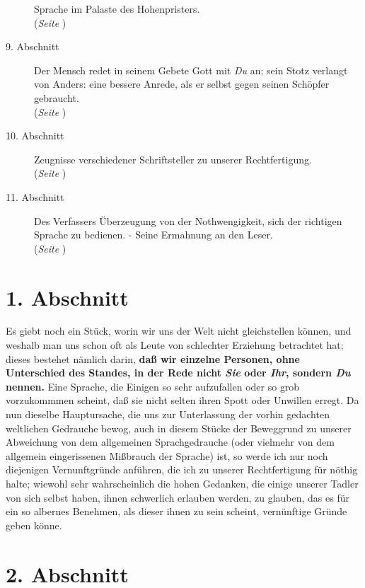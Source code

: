 \begin{description}
Sprache im Palaste des Hohenpristers.
\\(\textit{Seite \pageref{kap10_ab8}})
\item[9. Abschnitt] Der Mensch redet in seinem Gebete Gott mit \textit{Du} an; sein
Stotz verlangt von Anders: eine bessere Anrede, als er selbst gegen seinen
Schöpfer gebraucht.
\\(\textit{Seite \pageref{kap10_ab9}})
\item[10. Abschnitt] Zeugnisse verschiedener Schriftsteller zu unserer
Rechtfertigung.
\\(\textit{Seite \pageref{kap10_ab10}})
\item[11. Abschnitt] Des Verfassers Überzeugung von der Nothwengigkeit, sich
der richtigen Sprache zu bedienen. - Seine Ermahnung an den Leser.
\\(\textit{Seite \pageref{kap10_ab11}})

\end{description}
\normalsize

\section{1. Abschnitt} \label{kap10_ab1}

Es giebt noch ein Stück, worin wir uns der Welt nicht gleichstellen können, und
weshalb man uns schon oft als Leute von schlechter Erziehung betrachtet hat;
dieses bestehet nämlich darin, \textbf{daß wir einzelne Personen, ohne Unterschied des
Standes, in der Rede nicht \textit{Sie} oder \textit{Ihr}, sondern \textit{Du} nennen.} Eine
Sprache, die Einigen so sehr aufzufallen oder so grob vorzukommmen scheint, daß
sie nicht selten ihren Spott oder Unwillen erregt. Da nun dieselbe Hauptursache,
die uns zur Unterlassung der vorhin gedachten weltlichen Gedrauche bewog, auch
in diesem Stücke der Beweggrund zu unserer Abweichung von dem allgemeinen
Sprachgedrauche (oder vielmehr von dem allgemein eingerissenen Mißbrauch der
Sprache) ist, so werde ich nur noch diejenigen Vernunftgründe anführen, die ich
zu unserer Rechtfertigung für nöthig halte; wiewohl sehr wahrscheinlich die
hohen Gedanken, die einige unserer Tadler von sich selbst haben, ihnen
schwerlich erlauben werden, zu glauben, das es für ein so albernes Benehmen, als
dieser ihnen zu sein scheint, vernünftige Gründe geben könne.

\section{2. Abschnitt} \label{kap10_ab2}

